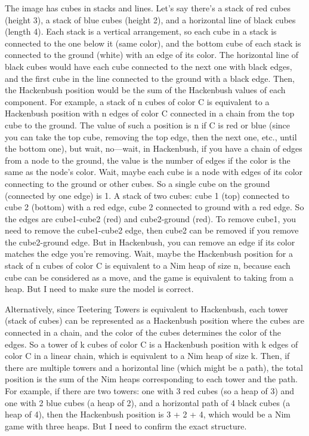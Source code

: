 The image has cubes in stacks and lines. Let's say there's a stack of red cubes (height 3), a stack of blue cubes (height 2), and a horizontal line of black cubes (length 4). Each stack is a vertical arrangement, so each cube in a stack is connected to the one below it (same color), and the bottom cube of each stack is connected to the ground (white) with an edge of its color. The horizontal line of black cubes would have each cube connected to the next one with black edges, and the first cube in the line connected to the ground with a black edge. Then, the Hackenbush position would be the sum of the Hackenbush values of each component. For example, a stack of n cubes of color C is equivalent to a Hackenbush position with n edges of color C connected in a chain from the top cube to the ground. The value of such a position is n if C is red or blue (since you can take the top cube, removing the top edge, then the next one, etc., until the bottom one), but wait, no—wait, in Hackenbush, if you have a chain of edges from a node to the ground, the value is the number of edges if the color is the same as the node's color. Wait, maybe each cube is a node with edges of its color connecting to the ground or other cubes. So a single cube on the ground (connected by one edge) is 1. A stack of two cubes: cube 1 (top) connected to cube 2 (bottom) with a red edge, cube 2 connected to ground with a red edge. So the edges are cube1-cube2 (red) and cube2-ground (red). To remove cube1, you need to remove the cube1-cube2 edge, then cube2 can be removed if you remove the cube2-ground edge. But in Hackenbush, you can remove an edge if its color matches the edge you're removing. Wait, maybe the Hackenbush position for a stack of n cubes of color C is equivalent to a Nim heap of size n, because each cube can be considered as a move, and the game is equivalent to taking from a heap. But I need to make sure the model is correct.

Alternatively, since Teetering Towers is equivalent to Hackenbush, each tower (stack of cubes) can be represented as a Hackenbush position where the cubes are connected in a chain, and the color of the cubes determines the color of the edges. So a tower of k cubes of color C is a Hackenbush position with k edges of color C in a linear chain, which is equivalent to a Nim heap of size k. Then, if there are multiple towers and a horizontal line (which might be a path), the total position is the sum of the Nim heaps corresponding to each tower and the path. For example, if there are two towers: one with 3 red cubes (so a heap of 3) and one with 2 blue cubes (a heap of 2), and a horizontal path of 4 black cubes (a heap of 4), then the Hackenbush position is 3 + 2 + 4, which would be a Nim game with three heaps. But I need to confirm the exact structure.

